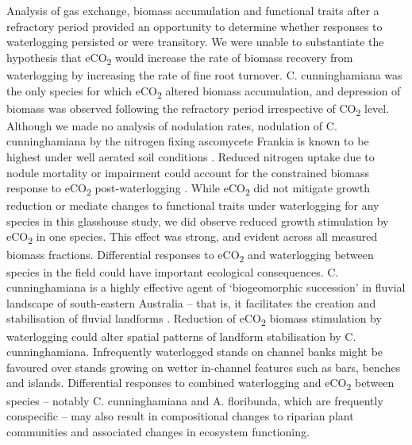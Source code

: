 \documentclass[12pt,a4paper]{memoir}
\begin{document}
Analysis of gas exchange, biomass accumulation and functional traits after a refractory period provided an opportunity to determine whether responses to waterlogging persisted or were transitory. We were unable to substantiate the hypothesis that eCO\textsubscript{2} would increase the rate of biomass recovery from waterlogging by increasing the rate of fine root turnover. C. cunninghamiana was the only species for which eCO\textsubscript{2} altered biomass accumulation, and depression of biomass was observed following the refractory period irrespective of CO\textsubscript{2} level. Although we made no analysis of nodulation rates, nodulation of C. cunninghamiana by the nitrogen fixing ascomycete Frankia is known to be highest under well aerated soil conditions \citep{Dawson1989}. Reduced nitrogen uptake due to nodule mortality or impairment could account for the constrained biomass response to eCO\textsubscript{2} post-waterlogging \citep{Reich2006}. While eCO\textsubscript{2} did not mitigate growth reduction or mediate changes to functional traits under waterlogging for any species in this glasshouse study, we did observe reduced growth stimulation by eCO\textsubscript{2} in one species. This effect was strong, and evident across all measured biomass fractions. Differential responses to eCO\textsubscript{2} and waterlogging between species in the field could have important ecological consequences. C. cunninghamiana is a highly effective agent of ‘biogeomorphic succession’ in fluvial landscape of south-eastern Australia – that is, it facilitates the creation and stabilisation of fluvial landforms \citep{Erskine2009}. Reduction of eCO\textsubscript{2} biomass stimulation by waterlogging could alter spatial patterns of landform stabilisation by C. cunninghamiana. Infrequently waterlogged stands on channel banks might be favoured over stands growing on wetter in-channel features such as bars, benches and islands. Differential responses to combined waterlogging and eCO\textsubscript{2} between species – notably C. cunninghamiana and A. floribunda, which are frequently conspecific – may also result in compositional changes to riparian plant communities and associated changes in ecosystem functioning.
\end{document}
